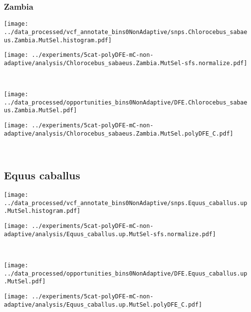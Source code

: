 \subsubsection{Zambia}

\begin{minipage}{0.49\linewidth}
    \texttt{[image: ../data\_processed/vcf\_annotate\_bins0NonAdaptive/snps.Chlorocebus\_sabaeus.Zambia.MutSel.histogram.pdf]}
\end{minipage}
\begin{minipage}{0.49\linewidth}
    \texttt{[image: ../experiments/5cat-polyDFE-mC-non-adaptive/analysis/Chlorocebus\_sabaeus.Zambia.MutSel-sfs.normalize.pdf]}
\end{minipage}
\\
\begin{minipage}{0.49\linewidth}
    \texttt{[image: ../data\_processed/opportunities\_bins0NonAdaptive/DFE.Chlorocebus\_sabaeus.Zambia.MutSel.pdf]}
\end{minipage}
\begin{minipage}{0.49\linewidth}
    \texttt{[image: ../experiments/5cat-polyDFE-mC-non-adaptive/analysis/Chlorocebus\_sabaeus.Zambia.MutSel.polyDFE\_C.pdf]}
\end{minipage}
\\

\subsection{Equus caballus}

\begin{minipage}{0.49\linewidth}
    \texttt{[image: ../data\_processed/vcf\_annotate\_bins0NonAdaptive/snps.Equus\_caballus.up.MutSel.histogram.pdf]}
\end{minipage}
\begin{minipage}{0.49\linewidth}
    \texttt{[image: ../experiments/5cat-polyDFE-mC-non-adaptive/analysis/Equus\_caballus.up.MutSel-sfs.normalize.pdf]}
\end{minipage}
\\
\begin{minipage}{0.49\linewidth}
    \texttt{[image: ../data\_processed/opportunities\_bins0NonAdaptive/DFE.Equus\_caballus.up.MutSel.pdf]}
\end{minipage}
\begin{minipage}{0.49\linewidth}
    \texttt{[image: ../experiments/5cat-polyDFE-mC-non-adaptive/analysis/Equus\_caballus.up.MutSel.polyDFE\_C.pdf]}
\end{minipage}
\\

